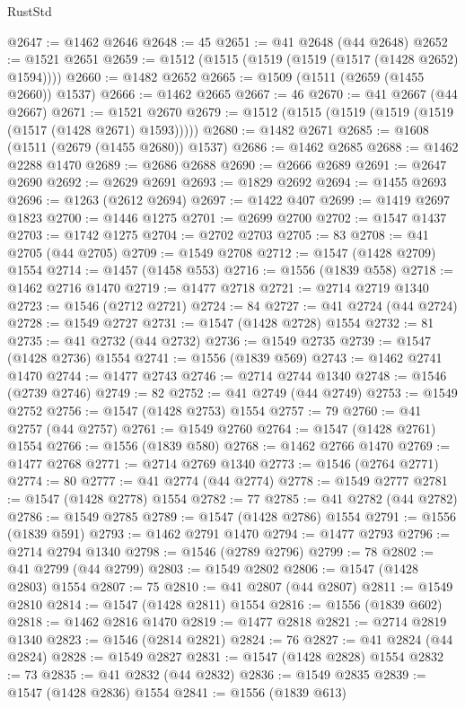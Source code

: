 \begin{lexlean}{RustStd}
\begin{coremodule}
@2647 := @1462 @2646
@2648 := 45
@2651 := @41 @2648 (@44 @2648)
@2652 := @1521 @2651
@2659 := @1512 (@1515 (@1519 (@1519 (@1517 (@1428 @2652) @1594))))
@2660 := @1482 @2652
@2665 := @1509 (@1511 (@2659 (@1455 @2660)) @1537)
@2666 := @1462 @2665
@2667 := 46
@2670 := @41 @2667 (@44 @2667)
@2671 := @1521 @2670
@2679 := @1512 (@1515 (@1519 (@1519 (@1519 (@1517 (@1428 @2671) @1593)))))
@2680 := @1482 @2671
@2685 := @1608 (@1511 (@2679 (@1455 @2680)) @1537)
@2686 := @1462 @2685
@2688 := @1462 @2288 @1470
@2689 := @2686 @2688
@2690 := @2666 @2689
@2691 := @2647 @2690
@2692 := @2629 @2691
@2693 := @1829 @2692
@2694 := @1455 @2693
@2696 := @1263 (@2612 @2694)
@2697 := @1422 @407
@2699 := @1419 @2697 @1823
@2700 := @1446 @1275
@2701 := @2699 @2700
@2702 := @1547 @1437
@2703 := @1742 @1275
@2704 := @2702 @2703
@2705 := 83
@2708 := @41 @2705 (@44 @2705)
@2709 := @1549 @2708
@2712 := @1547 (@1428 @2709) @1554
@2714 := @1457 (@1458 @553)
@2716 := @1556 (@1839 @558)
@2718 := @1462 @2716 @1470
@2719 := @1477 @2718
@2721 := @2714 @2719 @1340
@2723 := @1546 (@2712 @2721)
@2724 := 84
@2727 := @41 @2724 (@44 @2724)
@2728 := @1549 @2727
@2731 := @1547 (@1428 @2728) @1554
@2732 := 81
@2735 := @41 @2732 (@44 @2732)
@2736 := @1549 @2735
@2739 := @1547 (@1428 @2736) @1554
@2741 := @1556 (@1839 @569)
@2743 := @1462 @2741 @1470
@2744 := @1477 @2743
@2746 := @2714 @2744 @1340
@2748 := @1546 (@2739 @2746)
@2749 := 82
@2752 := @41 @2749 (@44 @2749)
@2753 := @1549 @2752
@2756 := @1547 (@1428 @2753) @1554
@2757 := 79
@2760 := @41 @2757 (@44 @2757)
@2761 := @1549 @2760
@2764 := @1547 (@1428 @2761) @1554
@2766 := @1556 (@1839 @580)
@2768 := @1462 @2766 @1470
@2769 := @1477 @2768
@2771 := @2714 @2769 @1340
@2773 := @1546 (@2764 @2771)
@2774 := 80
@2777 := @41 @2774 (@44 @2774)
@2778 := @1549 @2777
@2781 := @1547 (@1428 @2778) @1554
@2782 := 77
@2785 := @41 @2782 (@44 @2782)
@2786 := @1549 @2785
@2789 := @1547 (@1428 @2786) @1554
@2791 := @1556 (@1839 @591)
@2793 := @1462 @2791 @1470
@2794 := @1477 @2793
@2796 := @2714 @2794 @1340
@2798 := @1546 (@2789 @2796)
@2799 := 78
@2802 := @41 @2799 (@44 @2799)
@2803 := @1549 @2802
@2806 := @1547 (@1428 @2803) @1554
@2807 := 75
@2810 := @41 @2807 (@44 @2807)
@2811 := @1549 @2810
@2814 := @1547 (@1428 @2811) @1554
@2816 := @1556 (@1839 @602)
@2818 := @1462 @2816 @1470
@2819 := @1477 @2818
@2821 := @2714 @2819 @1340
@2823 := @1546 (@2814 @2821)
@2824 := 76
@2827 := @41 @2824 (@44 @2824)
@2828 := @1549 @2827
@2831 := @1547 (@1428 @2828) @1554
@2832 := 73
@2835 := @41 @2832 (@44 @2832)
@2836 := @1549 @2835
@2839 := @1547 (@1428 @2836) @1554
@2841 := @1556 (@1839 @613)

\end{coremodule}
\end{lexlean}
